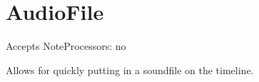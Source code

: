 \section{AudioFile}\label{audioFile}

Accepts NoteProcessors: no

Allows for quickly putting in a soundfile on the timeline.
